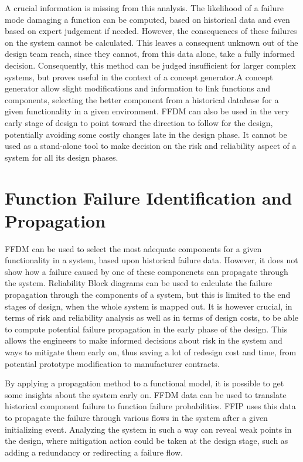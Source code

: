 A crucial information is missing from this analysis. The likelihood of a failure mode damaging a function can be computed, based on historical data and even based on expert judgement if needed. However, the consequences of these failures on the system cannot be calculated. This leaves a consequent unknown out of the design team reach, since they cannot, from this data alone, take a fully informed decision. Consequently, this method can be judged insufficient for larger complex systems, but proves useful in the context of a concept generator.A concept generator allow slight modifications and information to link functions and components, selecting the better component from a historical database for a given functionality in a given environment. FFDM can also be used in the very early stage of design to point toward the direction to follow for the design, potentially avoiding some costly changes late in the design phase. It cannot be used as a stand-alone tool to make decision on the risk and reliability aspect of a system for all its design phases.

\section{Function Failure Identification and Propagation}

FFDM can be used to select the most adequate components for a given functionality in a system, based upon historical failure data. However, it does not show how a failure caused by one of these componenets can propagate through the system. Reliability Block diagrams can be used to calculate the failure propagation through the components of a system, but this is limited to the end stages of design, when the whole system is mapped out. It is however crucial, in terms of risk and reliability analysis as well as in terms of design costs, to be able to compute potential failure propagation in the early phase of the design. This allows the engineers to make informed decisions about risk in the system and ways to mitigate them early on, thus saving a lot of redesign cost and time, from potential prototype modification to manufacturer contracts.

By applying a propagation method to a functional model, it is possible to get some insights about the system early on. FFDM data can be used to translate historical component failure to function failure probabilities. FFIP uses this data to propagate the failure through various flows in the system after a given initializing event. Analyzing the system in such a way can reveal weak points in the design, where mitigation action could be taken at the design stage, such as adding a redundancy or redirecting a failure flow.

